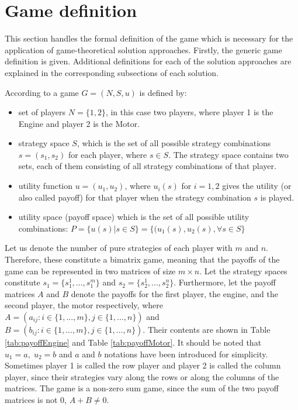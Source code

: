\section{Game definition}
This section handles the formal definition of the game which is necessary for the application of game-theoretical solution approaches. Firstly, the generic game definition is given. Additional definitions for each of the solution approaches are explained in the corresponding subsections of each solution.

According to \citet{holler2006einfuhrung} a game $G = (N,S,u)$ is defined by:
\begin{itemize}
\item
set of players $N = \{1,2\}$, in this case two players, where player 1 is the Engine and player 2 is the Motor.
\item
strategy space $S$, which is the set of all possible strategy combinations $s=(s_1,s_2)$ for each player, where $s \in S$. The strategy space contains two sets, each of them consisting of all strategy combinations of that player.
\item
utility function $u = (u_1,u_2)$, where $u_i(s)$ for $i=1,2$ gives the utility (or also called payoff) for that player when the strategy combination $s$ is played.
\item
utility space (payoff space) which is the set of all possible utility combinations:
$P = \{u(s)|s \in S\} = \{(u_1(s),u_2(s),  \forall s \in S\}$
\end{itemize} 

Let us denote the number of pure strategies of each player with $m$ and $n$. Therefore, these constitute a bimatrix game, meaning that the payoffs of the game can be represented in two matrices of size $m \times n$. Let the strategy spaces constitute $s_1 = \{s_1^1,...,s_1^m\}$ and $s_2 = \{s_2^1,...,s_2^n\}$. Furthermore, let the payoff matrices $A$ and $B$ denote the payoffs for the first player, the engine, and the second player, the motor respectively, where $A = (a_{ij}: i \in \{1,...,m\}, j \in \{ 1,...,n\})$ and $B = (b_{ij}: i \in \{1,...,m\}, j \in \{ 1,...,n\})$.  Their contents are shown in Table \ref{tab:payoffEngine} and Table \ref{tab:payoffMotor}. It should be noted that $u_1 = a, \; u_2 = b$ and $a$ and $b$ notations have been introduced for simplicity. Sometimes player 1 is called the row player and player 2 is called the column player, since their strategies vary along the rows or along the columns of the matrices. The game is a non-zero sum game, since the sum of the two payoff matrices is not 0, $A + B \neq 0$.

